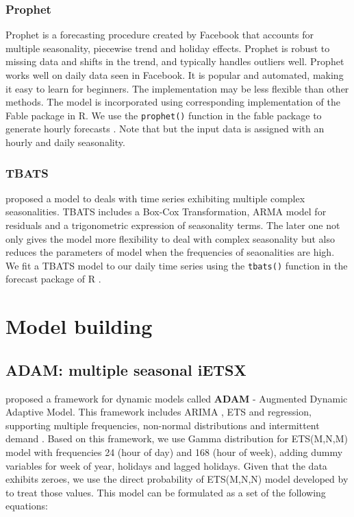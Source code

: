\documentclass[]{elsarticle} %
\begin{document}
\hypertarget{prophet}{%
\subsubsection{Prophet}\label{prophet}}

Prophet is a forecasting procedure created by Facebook \citep{taylor2018forecasting} that accounts for multiple seasonality, piecewise trend and holiday effects. Prophet is robust to missing data and shifts in the trend, and typically handles outliers well. Prophet works well on daily data seen in Facebook. It is popular and automated, making it easy to learn for beginners. The implementation may be less flexible than other methods.
The model is incorporated using corresponding implementation of the Fable package in R. We use the \texttt{prophet()} function in the fable package to generate hourly forecasts \citep{fable2020}. Note that but the input data is assigned with an hourly and daily seasonality.

\hypertarget{tbats}{%
\subsubsection{TBATS}\label{tbats}}

\citet{de2011forecasting} proposed a model to deals with time series exhibiting multiple complex seasonalities. TBATS includes a Box-Cox Transformation, ARMA model for residuals and a trigonometric expression of seasonality terms. The later one not only gives the model more flexibility to deal with complex seasonality but also reduces the parameters of model when the frequencies of seaonalities are high. We fit a TBATS model to our daily time series using the \texttt{tbats()} function in the forecast package of R \citep{forecastpackage2020}.

\hypertarget{model}{%
\section{Model building}\label{model}}

\hypertarget{adam-multiple-seasonal-ietsx}{%
\subsection{ADAM: multiple seasonal iETSX}\label{adam-multiple-seasonal-ietsx}}

\citet{SvetunkovAdam2021} proposed a framework for dynamic models called \textbf{ADAM} - Augmented Dynamic Adaptive Model. This framework includes ARIMA \citep{Box1976}, ETS \citep{Hyndman2008b} and regression, supporting multiple frequencies, non-normal distributions and intermittent demand \citep{Svetunkov2019a}. Based on this framework, we use Gamma distribution for ETS(M,N,M) model with frequencies 24 (hour of day) and 168 (hour of week), adding dummy variables for week of year, holidays and lagged holidays. Given that the data exhibits zeroes, we use the direct probability of ETS(M,N,N) model developed by \citet{Svetunkov2019a} to treat those values. This model can be formulated as a set of the following equations:
\end{document}
